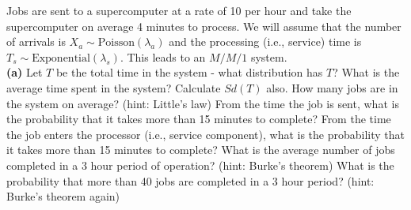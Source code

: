 

\item 
Jobs are sent to a supercomputer at a rate of 10 per hour and take the supercomputer on average 4 minutes to process. 
We will assume that the number of arrivals is $X_a \sim \text{Poisson}(\lambda_a)$ and the processing (i.e., service) time is $T_s \sim \text{Exponential}(\lambda_s)$. This leads to an $M/M/1$ system.\\[-0.2cm]

{\bf(a)} Let $T$ be the total time in the system - what distribution has $T$?  What is the average time spent in the system? Calculate $Sd(T)$ also.  How many jobs are in the system on average? (hint: Little's law)   From the time the job is sent, what is the probability that it takes more than 15 minutes to complete?   From the time the job enters the processor (i.e., service component), what is the probability that it takes more than 15 minutes to complete?  What is the average number of jobs completed in a 3 hour period of operation? (hint: Burke's theorem)  What is the probability that more than 40 jobs are completed in a 3 hour period? (hint: Burke's theorem again)



